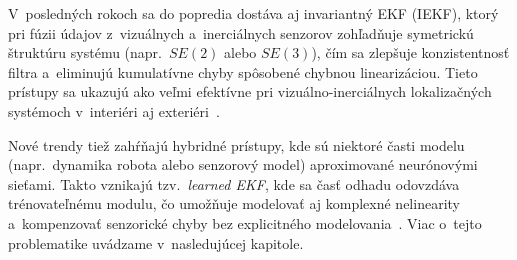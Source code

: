   V~posledných rokoch sa do popredia dostáva aj invariantný EKF (IEKF), ktorý pri fúzii údajov z~vizuálnych a~inerciálnych senzorov zohľadňuje symetrickú štruktúru systému (napr.\ $SE(2)$ alebo $SE(3)$), čím sa zlepšuje konzistentnosť filtra a~eliminujú kumulatívne chyby spôsobené chybnou linearizáciou. Tieto prístupy sa ukazujú ako veľmi efektívne pri vizuálno-inerciálnych lokalizačných systémoch v~interiéri aj exteriéri~\cite{barrauInvariantExtendedKalman2017}.

  Nové trendy tiež zahŕňajú hybridné prístupy, kde sú niektoré časti modelu (napr.\ dynamika robota alebo senzorový model) aproximované neurónovými sieťami. Takto vznikajú tzv.\ \emph{learned EKF}, kde sa časť odhadu odovzdáva trénovateľnému modulu, čo umožňuje modelovať aj komplexné nelinearity a~kompenzovať senzorické chyby bez explicitného modelovania~\cite{krishnanDeepKalmanFilters2015}. Viac o~tejto problematike uvádzame v~nasledujúcej kapitole.
